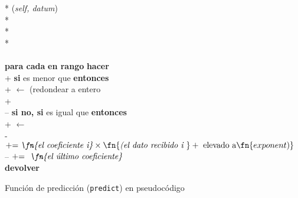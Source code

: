 \documentclass[conference,a4paper]{IEEEtran}
\begin{document}
\begin{figure}[t]
  \centering
  \begin{pseudo}*
    (\textit{self, datum}) \\*
     \\*
     \\*
     \\
     \\
    \textbf{para cada}  \textbf{en rango}  \textbf{hacer} \\+
    \textbf{si}  es menor que 
    \textbf{entonces} \\+
     \(\leftarrow\) 
    (redondear a entero \\+
     \\--
    \textbf{si no, si}  es igual que  \textbf{entonces} \\+
    \textit{} \(\leftarrow\)  \\-
     \\
     \(\mathrel{+}= \textit{\fn{el coeficiente i}} \times \fn{\textit{(el dato recibido i }} \\+
    \text{ elevado a} \fn{exponent)}\) \\--
     \(\mathrel{+}= \textit{ \fn{el último coeficiente}}\) \\
    \textbf{devolver} 
  \end{pseudo}
  \caption{Función de predicción (\texttt{predict}) en pseudocódigo}
  \label{pcd:predict}
\end{figure}
\end{document}
